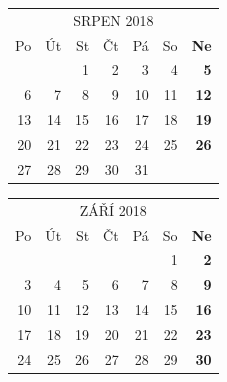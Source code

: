 \documentclass{article}
\begin{document}
\selectfont
\def\arraystretch{1.75}
\tabcolsep=10pt
\begin{tabular}{*6{r}>{\bfseries}r}
\multicolumn{7}{c}{SRPEN 2018}\\
\rowcolor[gray]{.75} Po & Út & St & Čt & Pá & So & Ne \\
\hline
                        &    & 1  & 2  & 3  & 4  & 5  \\
                     6  & 7  & 8  & 9  & 10 & 11 & 12 \\
                     13 & 14 & 15 & 16 & 17 & 18 & 19 \\
                     20 & 21 & 22 & 23 & 24 & 25 & 26 \\
                     27 & 28 & 29 & 30 & 31 &    &    \\
\end{tabular}

\newpage
\begin{table}[t!]
\centering
{}
\end{table}

\selectfont
\def\arraystretch{1.75}
\tabcolsep=10pt
\begin{tabular}{*6{r}>{\bfseries}r}
\multicolumn{7}{c}{ZÁŘÍ 2018}\\
\rowcolor[gray]{.75} Po & Út & St & Čt & Pá & So & Ne \\
\hline
                        &    &    &    &    & 1  & 2  \\
                     3  & 4  & 5  & 6  & 7  & 8  & 9  \\
                     10 & 11 & 12 & 13 & 14 & 15 & 16 \\
                     17 & 18 & 19 & 20 & 21 & 22 & 23 \\
                     24 & 25 & 26 & 27 & 28 & 29 & 30 \\
\end{tabular}
\end{document}
